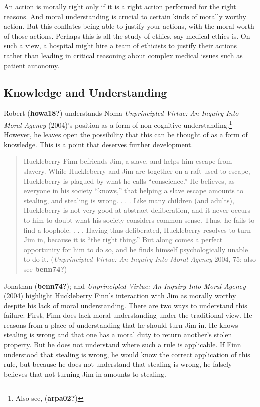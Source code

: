 \documentclass[12pt]{book}
\theoremstyle{definition}
\theoremstyle{remark}
\begin{document}
An action is morally right only if it is a right action performed for the right reasons. And moral understanding is crucial to certain kinds of morally worthy action. But this conflates being able to justify your actions, with the moral worth of those actions. Perhaps this is all the study of ethics, say medical ethics is. On such a view, a hospital might hire a team of ethicists to justify their actions rather than leading in critical reasoning about complex medical issues such as patient autonomy.

\subsection*{Knowledge and Understanding}\label{knowledge-and-understanding}

Robert (\textbf{howa18?}) understands Noma \emph{Unprincipled {Virtue}: {An Inquiry Into Moral Agency}} (2004)'s position as a form of non-cognitive understanding.\footnote{Also see, (\textbf{arpa02?})} However, he leaves open the possibility that this can be thought of as a form of knowledge. This is a point that deserves further development.

\begin{quote}
Huckleberry Finn befriends Jim, a slave, and helps him escape from slavery. While Huckleberry and Jim are together on a raft used to escape, Huckleberry is plagued by what he calls ``conscience.'' He believes, as everyone in his society ``knows,'' that helping a slave escape amounts to stealing, and stealing is wrong. . . . Like many children (and adults), Huckleberry is not very good at abstract deliberation, and it never occurs to him to doubt what his society considers common sense. Thus, he fails to find a loophole. . . . Having thus deliberated, Huckleberry resolves to turn Jim in, because it is ``the right thing.'' But along comes a perfect opportunity for him to do so, and he finds himself psychologically unable to do it. (\emph{Unprincipled {Virtue}: {An Inquiry Into Moral Agency}} 2004, 75; also see \textbf{benn74?})
\end{quote}

Jonathan (\textbf{benn74?}); and \emph{Unprincipled {Virtue}: {An Inquiry Into Moral Agency}} (2004) highlight Huckleberry Finn's interaction with Jim as morally worthy despite his lack of moral understanding. There are two ways to understand this failure. First, Finn does lack moral understanding under the traditional view. He reasons from a place of understanding that he should turn Jim in. He knows stealing is wrong and that one has a moral duty to return another's stolen property. But he does not understand where such a rule is applicable. If Finn understood that stealing is wrong, he would know the correct application of this rule, but because he does not understand that stealing is wrong, he falsely believes that not turning Jim in amounts to stealing.
\end{document}
